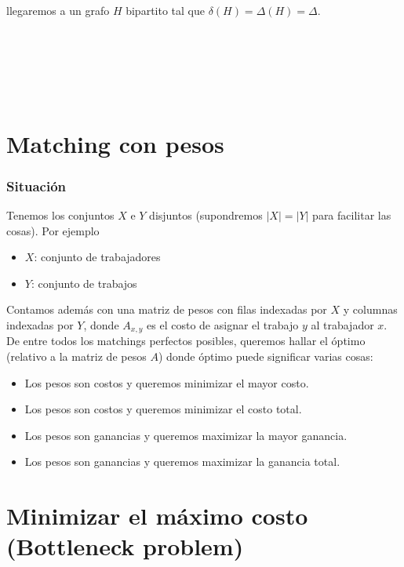\documentclass[10pt,a4paper]{article}
\begin{document}
llegaremos a un grafo $H$ bipartito tal que $\delta(H) = \Delta(H) = \Delta$.

\begin{center}
 
\end{center}

 

\begin{center}
 
\end{center}

\section*{Matching con pesos}

\subsubsection*{Situación}

Tenemos los conjuntos $X $ e $Y$ disjuntos (supondremos $\lvert X \rvert = \lvert Y \rvert$ para facilitar las cosas). Por ejemplo

\begin{itemize}

	\item $X$: conjunto de trabajadores
	\item $Y$: conjunto de trabajos
\end{itemize}

Contamos además con una matriz de pesos con filas indexadas por $X$ y columnas indexadas por $Y$, donde $A_{x,y}$ es el costo de asignar el trabajo $y$ al trabajador $x$. De entre todos los matchings perfectos posibles, queremos hallar el óptimo (relativo a la matriz de pesos $A$) donde óptimo puede significar varias cosas:

\begin{itemize}

	\item Los pesos son costos y queremos minimizar el mayor costo.
	\item Los pesos son costos y queremos minimizar el costo total.
	\item Los pesos son ganancias y queremos maximizar la mayor ganancia.
	\item Los pesos son ganancias y queremos maximizar la ganancia total.
\end{itemize}

\section*{Minimizar el máximo costo (Bottleneck problem)}
\end{document}
